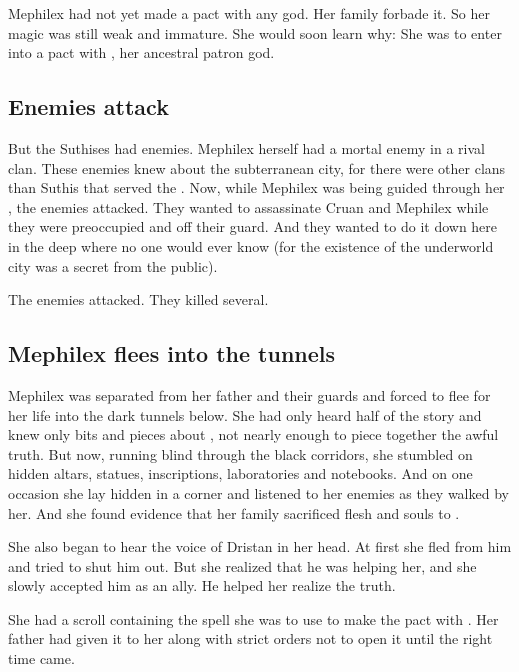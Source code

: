 Mephilex had not yet made a pact with any god. 
Her family forbade it. 
So her magic was still weak and immature.
She would soon learn why:
She was to enter into a pact with \Ubloth, her ancestral patron god. 









\subsection{Enemies attack}
But the Suthises had enemies. 
Mephilex herself had a mortal enemy in a rival clan. 
These enemies knew about the subterranean city, for there were other clans than Suthis that served the \ophidian \liches.  
Now, while Mephilex was being guided through her \arcana, the enemies attacked.
They wanted to assassinate Cruan and Mephilex while they were preoccupied and off their guard. 
And they wanted to do it down here in the deep where no one would ever know (for the existence of the underworld city was a secret from the public). 

The enemies attacked.
They killed several.









\subsection{Mephilex flees into the tunnels}
Mephilex was separated from her father and their guards and forced to flee for her life into the dark tunnels below. 
She had only heard half of the story and knew only bits and pieces about \Ubloth, not nearly enough to piece together the awful truth. 
But now, running blind through the black corridors, she stumbled on hidden altars, statues, inscriptions, laboratories and notebooks.
And on one occasion she lay hidden in a corner and listened to her enemies as they walked by her.
And she found evidence that her family sacrificed flesh and souls to \Ubloth. 

She also began to hear the voice of Dristan in her head. 
At first she fled from him and tried to shut him out.
But she realized that he was helping her, and she slowly accepted him as an ally. 
He helped her realize the truth. 

She had a scroll containing the spell she was to use to make the pact with \Ubloth.
Her father had given it to her along with strict orders not to open it until the right time came. 

